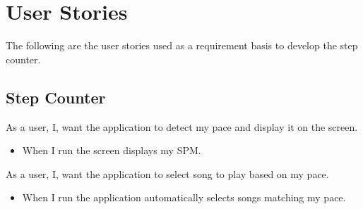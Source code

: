 \section{User Stories}
The following are the user stories used as a requirement basis to develop the step counter.

\subsection{Step Counter}
{As a user, I, want the application to detect my pace and display it on the screen. }
{\begin{itemize}
\item When I run the screen displays my SPM.
\end{itemize}}

{As a user, I, want the application to select song to play based on my pace.}
{\begin{itemize}
\item When I run the application automatically selects songs matching my pace.
\end{itemize}}